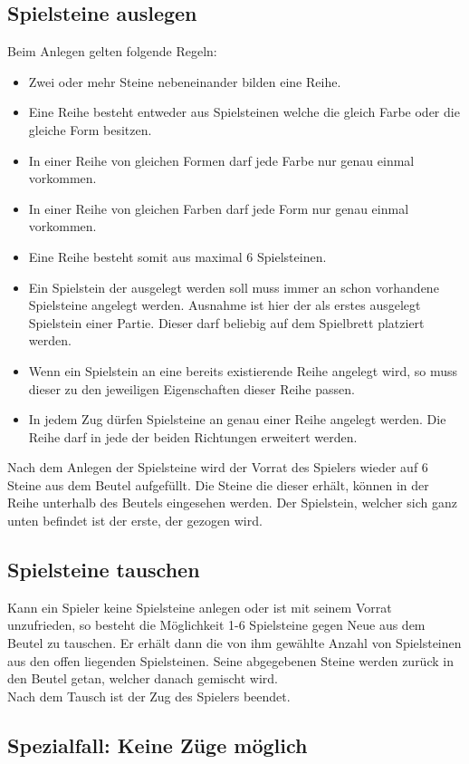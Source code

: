 \documentclass[a4paper, ngerman]{scrartcl}
\begin{document}
\subsection{Spielsteine auslegen}
Beim Anlegen gelten folgende Regeln:
\begin{itemize}
\item Zwei oder mehr Steine nebeneinander bilden eine Reihe.
\item Eine Reihe besteht entweder aus Spielsteinen welche die gleich Farbe oder die gleiche Form besitzen.
\item In einer Reihe von gleichen Formen darf jede Farbe nur genau einmal vorkommen.
\item In einer Reihe von gleichen Farben darf jede Form nur genau einmal vorkommen.
\item Eine Reihe besteht somit aus maximal 6 Spielsteinen.
\item Ein Spielstein der ausgelegt werden soll muss immer an schon vorhandene Spielsteine angelegt werden. Ausnahme ist hier der als erstes ausgelegt Spielstein einer Partie. Dieser darf beliebig auf dem Spielbrett platziert werden.
\item Wenn ein Spielstein an eine bereits existierende Reihe angelegt wird, so muss dieser zu den jeweiligen Eigenschaften dieser Reihe passen.
\item In jedem Zug dürfen Spielsteine an genau einer Reihe angelegt werden. Die Reihe darf in jede der beiden Richtungen erweitert werden.
\end{itemize}

Nach dem Anlegen der Spielsteine wird der Vorrat des Spielers wieder auf 6 Steine aus dem Beutel aufgefüllt. Die Steine die dieser erhält, können in der Reihe unterhalb des Beutels eingesehen werden. Der Spielstein, welcher sich ganz unten befindet ist der erste, der gezogen wird.
	 
\subsection{Spielsteine tauschen}
Kann ein Spieler keine Spielsteine anlegen oder ist mit seinem Vorrat unzufrieden, so besteht die Möglichkeit 1-6 Spielsteine gegen Neue aus dem Beutel zu tauschen. Er erhält dann die von ihm gewählte Anzahl von Spielsteinen aus den offen liegenden Spielsteinen. Seine abgegebenen Steine werden zurück in den Beutel getan, welcher danach gemischt wird.\\
Nach dem Tausch ist der Zug des Spielers beendet.
\subsection{Spezialfall: Keine Züge möglich}
\end{document}
